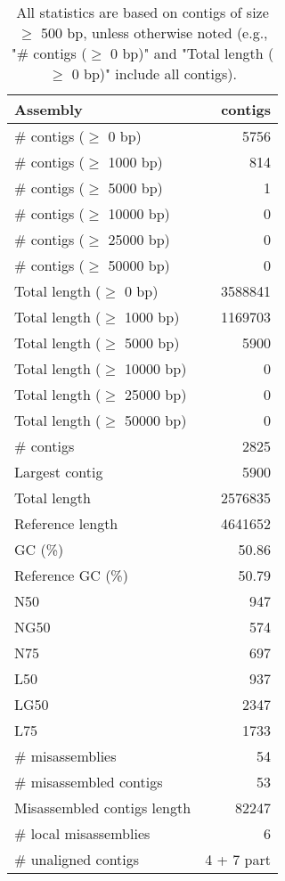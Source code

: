 \documentclass[12pt,a4paper]{article}
\begin{document}
\begin{table}[ht]
\begin{center}
\caption{All statistics are based on contigs of size $\geq$ 500 bp, unless otherwise noted (e.g., "\# contigs ($\geq$ 0 bp)" and "Total length ($\geq$ 0 bp)" include all contigs).}
\begin{tabular}{|l*{1}{|r}|}
\hline
Assembly & contigs \\ \hline
\# contigs ($\geq$ 0 bp) & 5756 \\ \hline
\# contigs ($\geq$ 1000 bp) & 814 \\ \hline
\# contigs ($\geq$ 5000 bp) & 1 \\ \hline
\# contigs ($\geq$ 10000 bp) & 0 \\ \hline
\# contigs ($\geq$ 25000 bp) & 0 \\ \hline
\# contigs ($\geq$ 50000 bp) & 0 \\ \hline
Total length ($\geq$ 0 bp) & 3588841 \\ \hline
Total length ($\geq$ 1000 bp) & 1169703 \\ \hline
Total length ($\geq$ 5000 bp) & 5900 \\ \hline
Total length ($\geq$ 10000 bp) & 0 \\ \hline
Total length ($\geq$ 25000 bp) & 0 \\ \hline
Total length ($\geq$ 50000 bp) & 0 \\ \hline
\# contigs & 2825 \\ \hline
Largest contig & 5900 \\ \hline
Total length & 2576835 \\ \hline
Reference length & 4641652 \\ \hline
GC (\%) & 50.86 \\ \hline
Reference GC (\%) & 50.79 \\ \hline
N50 & 947 \\ \hline
NG50 & 574 \\ \hline
N75 & 697 \\ \hline
L50 & 937 \\ \hline
LG50 & 2347 \\ \hline
L75 & 1733 \\ \hline
\# misassemblies & 54 \\ \hline
\# misassembled contigs & 53 \\ \hline
Misassembled contigs length & 82247 \\ \hline
\# local misassemblies & 6 \\ \hline
\# unaligned contigs & 4 + 7 part \\ \hline

\end{tabular}
\end{center}
\end{table}
\end{document}
